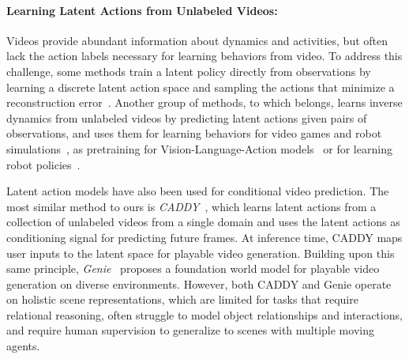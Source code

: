 




\paragraph{Learning Latent Actions from Unlabeled Videos:}
%

Videos provide abundant information about dynamics and activities, but often lack the action labels necessary for learning behaviors from video.
%
To address this challenge, some methods train a latent policy directly from observations by learning a discrete latent action space and sampling the actions that minimize a reconstruction error~\cite{Edwards_ImitatingLatentPoliciesFromObservation_2019, Struckmeier_ILPI_2023}.
%
Another group of methods, to which \Method{} belongs, learns inverse dynamics from unlabeled videos by predicting latent actions given pairs of observations, and uses them for learning behaviors for video games and robot simulations~\cite{Ye_BecomeAProficientPlayerByWatchingPureVideos_2022, Brandfonbrener_InverseDynamicsPretrainingLearnsGoodRepresentatiosForImitation_2024, Schmidt_LAPOLearningToActWithoutActions_2024}, as pretraining for Vision-Language-Action models~\cite{Ye_LatentActionPretrainingFromVideos_2024} or for learning robot policies~\cite{Cui_DynaMoDynamcisPretrainingForVisuoMotorControl_2024}.
%

Latent action models have also been used for conditional video prediction.
%
The most similar method to ours is \emph{CADDY}~\cite{Menapace_PlayableVideoGeneration_2021, Menapace_PlayableEnvironments_2022}, which learns latent actions from a collection of unlabeled videos from a single domain and uses the latent actions as conditioning signal for predicting future frames.
%
At inference time, CADDY maps user inputs to the latent space for playable video generation.
%
Building upon this same principle, \emph{Genie}~\cite{Bruce_GenieGenerativeInteractiveEnvironments_2024} proposes a foundation world model for playable video generation on diverse environments.
%
However, both CADDY and Genie operate on holistic scene representations, which are limited for tasks that require relational reasoning, often struggle to model object relationships and interactions, and require human supervision to generalize to scenes with multiple moving agents.










